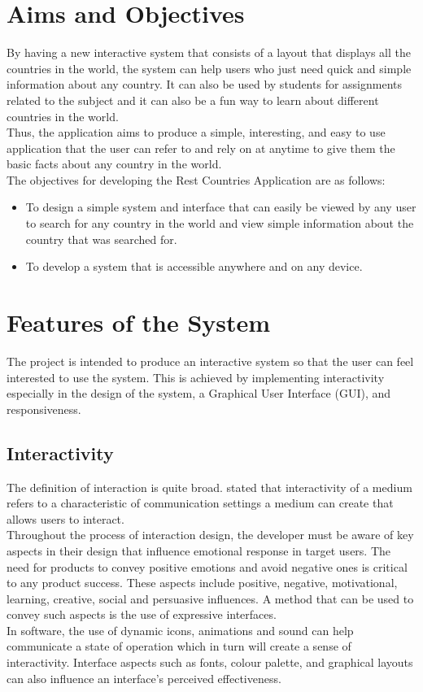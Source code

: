 \documentclass[twoside, a4paper, 12pt]{report}
\begin{document}
\section{Aims and Objectives}
By having a new interactive system that consists of a layout that displays all the countries in the world, the system can help users who just need quick and simple information about any country. It can also be used by students for assignments related to the subject and it can also be a fun way to learn about different countries in the world.\\
\indent
Thus, the application aims to produce a simple, interesting, and easy to use application that the user can refer to and rely on at anytime to give them the basic facts about any country in the world.\\
\indent
The objectives for developing the Rest Countries Application are as follows:
\begin{itemize}
\item To design a simple system and interface that can easily be viewed by any user to search for any country in the world and view simple information about the country that was searched for.
\item To develop a system that is accessible anywhere and on any device.
\end{itemize}

\section{Features of the System}
The project is intended to produce an interactive system so that the user can feel interested to use the system. This is achieved by implementing interactivity especially in the design of the system, a Graphical User Interface (GUI), and responsiveness.

\subsection{Interactivity}
The definition of interaction is quite broad. \autocite{aoki2000taxonomy} stated that interactivity of a medium refers to a characteristic of communication settings a medium can create that allows users to interact.\\
\indent
Throughout the process of interaction design, the developer must be aware of key aspects in their design that influence emotional response in target users. The need for products to convey positive emotions and avoid negative ones is critical to any product success. These aspects include positive, negative, motivational, learning, creative, social and persuasive influences. A method that can be used to convey such aspects is the use of expressive interfaces. \autocite{kamari2011interactive} \\
\indent
In software, the use of dynamic icons, animations and sound can help communicate a state of operation which in turn will create a sense of interactivity. Interface aspects such as fonts, colour palette, and graphical layouts can also influence an interface's perceived effectiveness.
\end{document}
